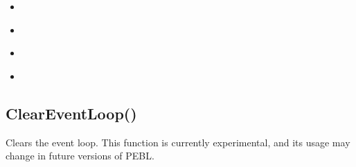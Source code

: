 \documentclass[letterpaper,10pt,english]{sphinxmanual}
\begin{document}
\begin{sphinxShadowBox}
\begin{itemize}
\item {} 
\sphinxAtStartPar
{}\label{\detokenize{reference/peblenvironment:id80}}{\hyperref[\detokenize{reference/peblenvironment:waitforlistkeypress}]{}}

\item {} 
\sphinxAtStartPar
{}\label{\detokenize{reference/peblenvironment:id81}}{\hyperref[\detokenize{reference/peblenvironment:waitforlistkeypresswithtimeout}]{}}

\item {} 
\sphinxAtStartPar
{}\label{\detokenize{reference/peblenvironment:id82}}{\hyperref[\detokenize{reference/peblenvironment:waitformousebutton}]{}}

\item {} 
\sphinxAtStartPar
{}\label{\detokenize{reference/peblenvironment:id83}}{\hyperref[\detokenize{reference/peblenvironment:waitformousebuttonwithtimeout}]{}}

\end{itemize}
\end{sphinxShadowBox}

\ignorespaces 

\subsection{ClearEventLoop()}
\label{\detokenize{reference/peblenvironment:cleareventloop}}\label{\detokenize{reference/peblenvironment:index-0}}
\sphinxAtStartPar
{}

\sphinxAtStartPar
{}

\sphinxAtStartPar
Clears the event loop.  This function is currently experimental, and its usage may change in future versions of PEBL.

\sphinxAtStartPar
{}

\begin{sphinxVerbatim}[commandchars=\\\{\}]
\PYG{p}{[}\PYG{p}{]}
\end{sphinxVerbatim}
\end{document}
